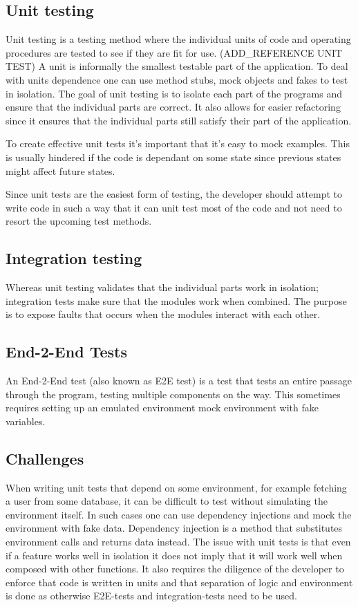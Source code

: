 \subsection{Unit testing}

Unit testing is a testing method where the individual units of code and
operating procedures are tested to see if they are fit for use. (ADD\_REFERENCE
UNIT TEST) A unit is informally the smallest testable part of the application.
To deal with units dependence one can use method stubs, mock objects and fakes
to test in isolation. The goal of unit testing is to isolate each part of the
programs and ensure that the individual parts are correct. It also allows for
easier refactoring since it ensures that the individual parts still satisfy
their part of the application.

To create effective unit tests it's important that it's easy to mock examples.
This is usually hindered if the code is dependant on some state since previous
states might affect future states.

Since unit tests are the easiest form of testing, the developer should attempt
to write code in such a way that it can unit test most of the code and not need
to resort the upcoming test methods.

\subsection{Integration testing}

Whereas unit testing validates that the individual parts work in isolation;
integration tests make sure that the modules work when combined. The purpose is
to expose faults that occurs when the modules interact with each other.

\subsection{End-2-End Tests}

An End-2-End test (also known as E2E test) is a test that tests an entire
passage through the program, testing multiple components on the way. This
sometimes requires setting up an emulated environment mock environment with fake
variables.

\subsection{Challenges}\label{challenges}

When writing unit tests that depend on some environment, for example fetching a
user from some database, it can be difficult to test without simulating the
environment itself. In such cases one can use dependency injections and mock the
environment with fake data. Dependency injection is a method that substitutes
environment calls and returns data instead. The issue with unit tests is that
even if a feature works well in isolation it does not imply that it will work
well when composed with other functions. It also requires the diligence of the
developer to enforce that code is written in units and that separation of logic
and environment is done as otherwise E2E-tests and integration-tests need to be
used.

